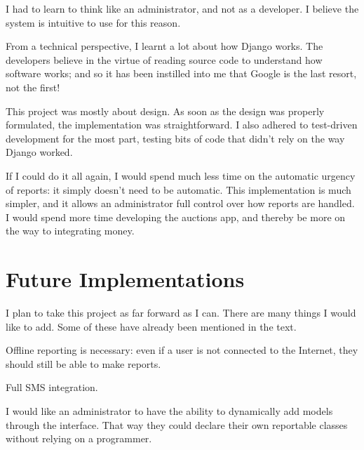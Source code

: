 I had to learn to think like an administrator, and not as a developer. I believe the system is intuitive to use for this reason.

From a technical perspective, I learnt a lot about how Django works. The developers believe in the virtue of reading source code to understand how software works; and so it has been instilled into me that Google is the last resort, not the first!

This project was mostly about design. As soon as the design was properly formulated, the implementation was straightforward. I also adhered to test-driven development for the most part, testing bits of code that didn't rely on the way Django worked.

If I could do it all again, I would spend much less time on the automatic urgency of reports: it simply doesn't need to be automatic. This implementation is much simpler, and it allows an administrator full control over how reports are handled. I would spend more time developing the auctions app, and thereby be more on the way to integrating money.

\section{Future Implementations}
I plan to take this project as far forward as I can. There are many things I would like to add. Some of these have already been mentioned in the text.

Offline reporting is necessary: even if a user is not connected to the Internet, they should still be able to make reports.

Full SMS integration.

I would like an administrator to have the ability to dynamically add models through the interface. That way they could declare their own reportable classes without relying on a programmer.